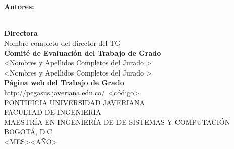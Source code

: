 \thispagestyle{empty}

\begin{center}

		\fontsize{12pt}{12pt}\textbf{\CODIGOTG\ }\\
		\fontsize{14pt}{14pt}\selectfont \TITULOTG\ \\ %
		\vspace*{3cm}
		\fontsize{12pt}{12pt}\textbf{Autores:}\\ 
		\vspace{0.2cm}
		\fontsize{14pt}{14pt} \AUTORESTG\ \\
        \vspace*{4cm}

        \vspace*{1.7cm}
		\fontsize{12pt}{12pt}\textbf{Directora}\\
		\vspace{0.2cm}
        Nombre completo del director del TG\\
        \vspace{0.2cm}
        \textbf{Comité de Evaluación del Trabajo de Grado}\\
        \vspace{0.2cm}
        <Nombres y Apellidos Completos del Jurado >\\
        \vspace{0.2cm}
        <Nombres y Apellidos Completos del Jurado >\\
        \vspace{0.2cm}
        \textbf{Página web del Trabajo de Grado}\\
        \vspace{0.2cm}
        http://pegasus.javeriana.edu.co/~<código>\\

		\vspace*{1.8cm}
		\fontsize{12pt}{12pt}\selectfont PONTIFICIA UNIVERSIDAD JAVERIANA\\
		FACULTAD DE INGENIERIA\\
		MAESTRÍA EN INGENIERÍA DE DE SISTEMAS Y COMPUTACIÓN\\
		BOGOTÁ, D.C.\\
		<MES><AÑO> %
\end{center}